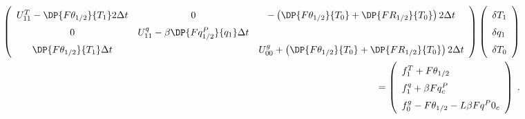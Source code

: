 \begin{eqnarray}
 \renewcommand{\arraystretch}{1.5}
  \left( \begin{array}{ccc}
      U_{11}^T - \DP{F\theta_{1/2}}{T_1} 2 \Delta t &
      0 &
      - \left( \DP{F\theta_{1/2}}{T_0} 
                         + \DP{FR_{1/2}}{T_0}\right) 2 \Delta t \\
      0 &
      U_{11}^q - \beta \DP{Fq^P_{1/2}}{q_1} \Delta t & \\
        \DP{F\theta_{1/2}}{T_1} \Delta t & 
                                         &
      U_{00}^g + \left(\DP{F\theta_{1/2}}{T_0}
                + \DP{FR_{1/2}}{T_0} \right) 2 \Delta t \\
  \end{array} \right)
  \left( \begin{array}{l}
      \delta T_1 \\ \delta q_1 \\ \delta T_0 \\
  \end{array} \right)  \nonumber \\
=
  \left( \begin{array}{l}
      f_1^T + F\theta_{1/2} \\  
      f_1^q + \beta Fq^P_c \\  
      f_0^g - F\theta_{1/2} - L \beta Fq^P0_c \\  
  \end{array} \right) \; .
\end{eqnarray}

